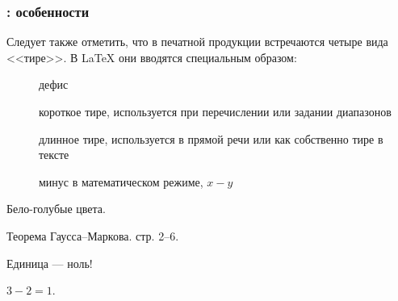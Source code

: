 \documentclass{beamer}
\begin{document}
\begin{frame}[fragile]
\frametitle{\insertsubsection{}: особенности}
\vspace{-2ex}
\small
Следует также отметить, что в печатной продукции встречаются четыре
вида <<тире>>. В \LaTeX{} они вводятся специальным образом:
\vspace{-1ex}
\begin{description}
  \item[\keystrokebftt{-}] дефис
  \item[\keystrokebftt{-}\keystrokebftt{-}] короткое тире, используется
    при перечислении или задании диапазонов
  \item[\keystrokebftt{-}\keystrokebftt{-}\keystrokebftt{-}] длинное тире,
    используется в прямой речи или как собственно тире в тексте
  \item[\keystrokebftt{\$}\keystrokebftt{-}\keystrokebftt{\$}] минус в
    математическом режиме, $x - y$
\end{description}
\begin{exampletwouptiny}
Бело-голубые цвета.

Теорема Гаусса--Маркова. стр. 2--6.

Единица --- ноль!

$3 - 2 = 1$.
\end{exampletwouptiny}
\end{frame}
\end{document}
